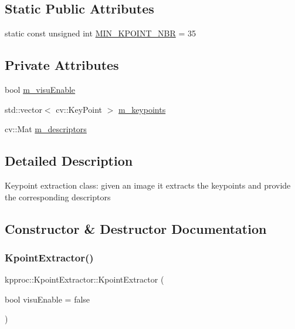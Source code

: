 \subsection*{Static Public Attributes}
\begin{DoxyCompactItemize}
\item 
static const unsigned int \hyperlink{classkpproc_1_1KpointExtractor_a1d7c3437fc6b2cff35d60df9f554dd12}{M\+I\+N\+\_\+\+K\+P\+O\+I\+N\+T\+\_\+\+N\+BR} = 35
\end{DoxyCompactItemize}
\subsection*{Private Attributes}
\begin{DoxyCompactItemize}
\item 
bool \hyperlink{classkpproc_1_1KpointExtractor_ab0f534203a246814b163aa3dffeef1b5}{m\+\_\+visu\+Enable}
\item 
std\+::vector$<$ cv\+::\+Key\+Point $>$ \hyperlink{classkpproc_1_1KpointExtractor_ace5a9a7c0bc1cea6e181b72f41588205}{m\+\_\+keypoints}
\item 
cv\+::\+Mat \hyperlink{classkpproc_1_1KpointExtractor_a27bff1246cd947b3d84272a4b06b6498}{m\+\_\+descriptors}
\end{DoxyCompactItemize}


\subsection{Detailed Description}
Keypoint extraction class\+: given an image it extracts the keypoints and provide the corresponding descriptors 

\subsection{Constructor \& Destructor Documentation}
\mbox{\label{classkpproc_1_1KpointExtractor_ad05a95e4da00ee5d14a4c1b99141cd08}} 
\subsubsection{\texorpdfstring{Kpoint\+Extractor()}{KpointExtractor()}}
{\footnotesize\ttfamily kpproc\+::\+Kpoint\+Extractor\+::\+Kpoint\+Extractor (\begin{DoxyParamCaption}\item[{bool}]{visu\+Enable = {\ttfamily false} }\end{DoxyParamCaption})\hspace{0.3cm}{\ttfamily [inline]}}




